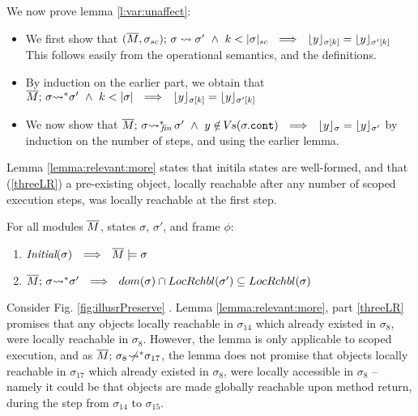 We now prove lemma \ref{l:var:unaffect}:

\begin{itemize}
\item
We first show that $\leadstoBoundedThree {\Mtwo} {\sigma} {\sigma\bd}  {\sigma'}   \ \wedge \ k<\DepthSt \sigma\bd  \ \ \Longrightarrow \ \  \interpret {\RestrictTo \sigma k} y =  \interpret {\RestrictTo {\sigma'} k} y$
This follows easily from the operational semantics, and the definitions.


\item
By induction on the earlier part, we  obtain that $\leadstoBoundedStar {\Mtwo}  {\sigma}  {\sigma'}  \ \wedge \ k<\DepthSt \sigma  \ \ \Longrightarrow \ \  \interpret {\RestrictTo \sigma k} y =  \interpret {\RestrictTo {\sigma'} k} y$

\item

We now show that $\leadstoBoundedStarFin {\Mtwo}  {\sigma}  {\sigma'} \ \wedge \ y\notin \vs(\sigma.\prg{cont}) \ \ \Longrightarrow \ \  \interpret \sigma y =  \interpret {\sigma'} y$ by  induction on the number of steps, and  using the earlier lemma.
\end{itemize}
\completeProof

{Lemma \ref{lemma:relevant:more} states that initila states are well-formed, and that (\ref{threeLR}) a pre-existing object, locally reachable after any number of scoped execution steps, was locally reachable at the first step.


\begin{lemma}
\label{lemma:relevant:more}
For all modules $\overline{M}$, states $\sigma$, $\sigma'$,   and frame $\phi$:
\begin{enumerate}
\item
\label{lemma:relevant:more:one}
$\textit{Initial}(\sigma)  \ \    \Longrightarrow \ \ \overline{M} \models \sigma $
\item
\label{threeLR}
{${\leadstoBoundedStar {\Mtwo}  {\sigma}    {\sigma'}}  \ \  \Longrightarrow\ \ 
dom(\sigma) \cap \LRelevantO {\sigma'} \subseteq   \LRelevantO {\sigma}$
}

\end{enumerate}
\end{lemma}

{Consider Fig.  \ref{fig:illusrPreserve} . %
Lemma \ref{lemma:relevant:more}, part \ref{threeLR}  promises that any objects locally reachable in $\sigma_{14}$ which already existed in $\sigma_{8}$, were locally reachable in $\sigma_{8}$. However, the lemma is only  applicable to scoped execution, and as 
$\overline{M};\, {\sigma_8} \not\!\!\!{\rightsquigarrow^*} \sigma_{17}$, 
the lemma does not promise that  objects locally reachable in $\sigma_{17}$ which already existed in $\sigma_{8}$, were locally accessible in $\sigma_{8}$ -- namely it could be that objects are made globally reachable upon method return, during the step from $\sigma_{14}$ to $\sigma_{15}$.}
}

